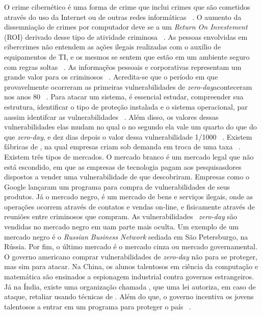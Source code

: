 \documentclass[brazil, utf8]{article}
\begin{document}
O crime cibernético é uma forma de crime que inclui crimes que são cometidos através do uso da
Internet ou de outras redes informáticas ~\cite{Armin:2015}. O aumento da dissemniação de crimes
por computador deve se a um \textit{Return On Investement} (ROI) derivado desse tipo de atividade 
criminosa ~\cite{Armin:2015}. As pessoas envolvidas em cibercrimes não entendem as ações ilegais   
realizadas com o auxílio de equipamentos de TI, e os mesmos se sentem que estão em um ambiente 
seguro com regras soltas ~\cite{Armin:2015}. As informaçẽos pessoais e corporativas representam um 
grande valor para os criminosos ~\cite{Armin:2015}. Acredita-se que o período em que provavelmente 
ocorreram as primeiras vulnerabilidades de \textit{zero-day}aconteceram nos anos 80 ~\cite{
Armin:2015}. Para atacar um sistema, é essencial estudar, compreender sua estrutura, identificar o 
tipo de proteção instalada e o sistema operacional, par aassim identifcar as vulnerabilidades
~\cite{Armin:2015}. Além disso, os valores dessas vulnerabilidades elas mudam no qual o no segundo 
ela vale um quarto do que do que \textit{zero-day}, e dez dias depois o valor dessa 
vulnerabilidade 1/1000 ~\cite{Armin:2015}. Existem fábricas de , na qual empresas 
criam  sob demanda em troca de uma taxa ~\cite{Armin:2015}. Existem três tipos de 
mercados. O mercado branco é um mercado legal que não está escondido, em que as empresas de 
tecnologia pagam aos pesquisasdores dispostos a vender uma vulnerabilidade de  que 
descobriram. Empresas como o Google lançaram um programa para compra de vulnerabilidades de seus 
produtos. Já o mercado negro, é um mercado de bens e serviços ilegais, onde as operações ocorrem  
através de contatos e vendas on-line, e fisicamente através de reuniões entre criminosos que 
compram. As vulnerabilidades ~\textit{zero-day} são vendidas no mercado negro em uam parte mais 
oculta. Um exemplo de um mercado negro é o \textit{Russian Business Network} sediada em São 
Petersburgo, na Rússia. Por fim, o último mercado é o mercado cinza ou mercado governamental. O 
governo americano comprar vulnerabilidades de \textit{zero-day} não para se proteger, mas sim para 
atacar. Na China, os alunos talentosos em ciência da computação e matemática são ensinados a 
espionagem industrial contra governos estrangeiros. Já na Índia, existe uma organização chamada 
, que uma lei autoriza, em caso de ataque, 
retaliar usando técnicas de . Além do que, o governo incentiva os jovens talentosos 
a entrar em um programa para proteger o país ~\cite{Armin:2015}.
\end{document}
